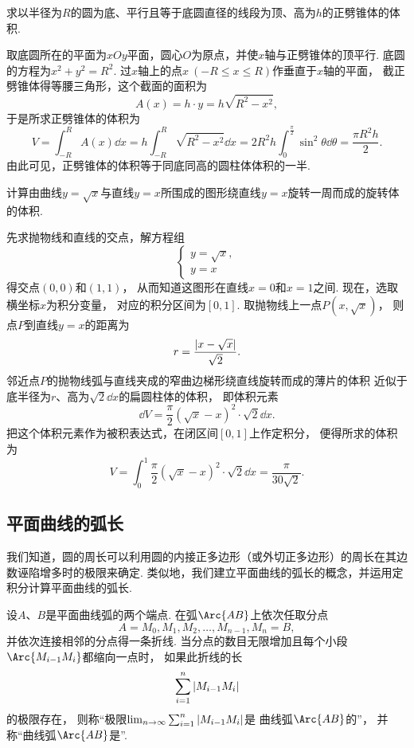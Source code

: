 \begin{example}
求以半径为\(R\)的圆为底、平行且等于底圆直径的线段为顶、高为\(h\)的正劈锥体的体积.
\begin{solution}
取底圆所在的平面为\(xOy\)平面，圆心\(O\)为原点，并使\(x\)轴与正劈锥体的顶平行.
底圆的方程为\(x^2+y^2=R^2\).
过\(x\)轴上的点\(x\ (-R \leq x \leq R)\)作垂直于\(x\)轴的平面，
截正劈锥体得等腰三角形，这个截面的面积为\[
	A(x) = h \cdot y = h \sqrt{R^2-x^2},
\]
于是所求正劈锥体的体积为\[
	V = \int_{-R}^R A(x) \dd{x}
	= h \int_{-R}^R \sqrt{R^2-x^2} \dd{x}
	= 2 R^2 h \int_0^{\frac\pi2} \sin^2\theta \dd{\theta}
	= \frac{\pi R^2 h}2.
\]
由此可见，正劈锥体的体积等于同底同高的圆柱体体积的一半.
\end{solution}
\end{example}

\begin{example}
计算由曲线\(y=\sqrt{x}\)与直线\(y=x\)所围成的图形绕直线\(y=x\)旋转一周而成的旋转体的体积.
\begin{solution}
先求抛物线和直线的交点，解方程组\[
	\left\{ \begin{array}{l}
		y=\sqrt{x}, \\
		y=x
	\end{array} \right.
\]得交点\((0,0)\)和\((1,1)\)，
从而知道这图形在直线\(x=0\)和\(x=1\)之间.
现在，选取横坐标\(x\)为积分变量，
对应的积分区间为\([0,1]\).
取抛物线上一点\(P(x,\sqrt{x})\)，
则点\(P\)到直线\(y=x\)的距离为\[
	r = \frac{\abs{x-\sqrt{x}}}{\sqrt2}.
\]
邻近点\(P\)的抛物线弧与直线夹成的窄曲边梯形绕直线旋转而成的薄片的体积
近似于底半径为\(r\)、高为\(\sqrt2 \dd{x}\)的扁圆柱体的体积，
即体积元素\[
	\dd{V} = \frac\pi2 (\sqrt{x}-x)^2 \cdot \sqrt2 \dd{x}.
\]
把这个体积元素作为被积表达式，在闭区间\([0,1]\)上作定积分，
便得所求的体积为\[
	V = \int_0^1 \frac\pi2 (\sqrt{x}-x)^2 \cdot \sqrt2 \dd{x}
	= \frac\pi{30\sqrt2}.
\]
\end{solution}
\end{example}

\subsection{平面曲线的弧长}
我们知道，圆的周长可以利用圆的内接正多边形（或外切正多边形）的周长在其边数诬陷增多时的极限来确定.
类似地，我们建立平面曲线的弧长的概念，并运用定积分计算平面曲线的弧长.

设\(A\)、\(B\)是平面曲线弧的两个端点.
在弧\(\Arc{AB}\)上依次任取分点\[
	A=M_0,M_1,M_2,\dotsc,M_{n-1},M_n=B,
\]并依次连接相邻的分点得一条折线.
当分点的数目无限增加且每个小段\(\Arc{M_{i-1}M_i}\)都缩向一点时，
如果此折线的长\[
	\sum_{i=1}^n \abs{M_{i-1} M_i}
\]的极限存在，
则称“极限\(\lim_{n\to\infty} \sum_{i=1}^n \abs{M_{i-1} M_i}\)是
曲线弧\(\Arc{AB}\)的”，
并称“曲线弧\(\Arc{AB}\)是”.

